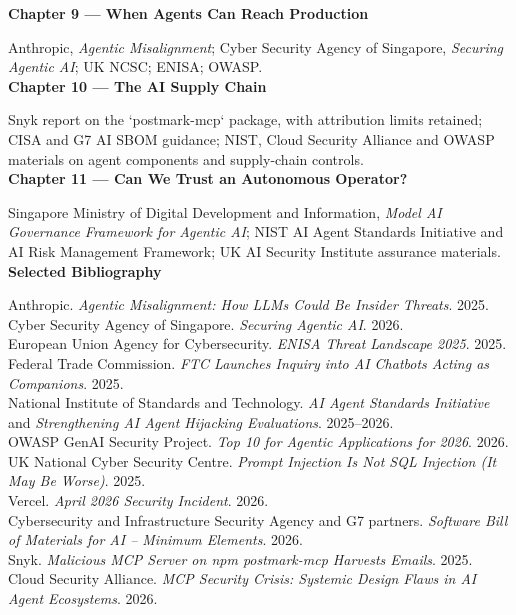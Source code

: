 \documentclass[10pt,twoside]{article}
\begin{document}
{\sffamily\bfseries Chapter 9 — When Agents Can Reach Production}\par Anthropic, \emph{Agentic Misalignment}; Cyber Security Agency of Singapore, \emph{Securing Agentic AI}; UK NCSC; ENISA; OWASP.\\[9pt]
{\sffamily\bfseries Chapter 10 — The AI Supply Chain}\par Snyk report on the `postmark-mcp` package, with attribution limits retained; CISA and G7 AI SBOM guidance; NIST, Cloud Security Alliance and OWASP materials on agent components and supply-chain controls.\\[9pt]
{\sffamily\bfseries Chapter 11 — Can We Trust an Autonomous Operator?}\par Singapore Ministry of Digital Development and Information, \emph{Model AI Governance Framework for Agentic AI}; NIST AI Agent Standards Initiative and AI Risk Management Framework; UK AI Security Institute assurance materials.\\[18pt]
{\sffamily\bfseries\large Selected Bibliography}\par\vspace{8pt}
Anthropic. \emph{Agentic Misalignment: How LLMs Could Be Insider Threats}. 2025.\\
Cyber Security Agency of Singapore. \emph{Securing Agentic AI}. 2026.\\
European Union Agency for Cybersecurity. \emph{ENISA Threat Landscape 2025}. 2025.\\
Federal Trade Commission. \emph{FTC Launches Inquiry into AI Chatbots Acting as Companions}. 2025.\\
National Institute of Standards and Technology. \emph{AI Agent Standards Initiative} and \emph{Strengthening AI Agent Hijacking Evaluations}. 2025–2026.\\
OWASP GenAI Security Project. \emph{Top 10 for Agentic Applications for 2026}. 2026.\\
UK National Cyber Security Centre. \emph{Prompt Injection Is Not SQL Injection (It May Be Worse)}. 2025.\\
Vercel. \emph{April 2026 Security Incident}. 2026.\\
Cybersecurity and Infrastructure Security Agency and G7 partners. \emph{Software Bill of Materials for AI -- Minimum Elements}. 2026.\\
Snyk. \emph{Malicious MCP Server on npm postmark-mcp Harvests Emails}. 2025.\\
Cloud Security Alliance. \emph{MCP Security Crisis: Systemic Design Flaws in AI Agent Ecosystems}. 2026.\\
\end{document}
